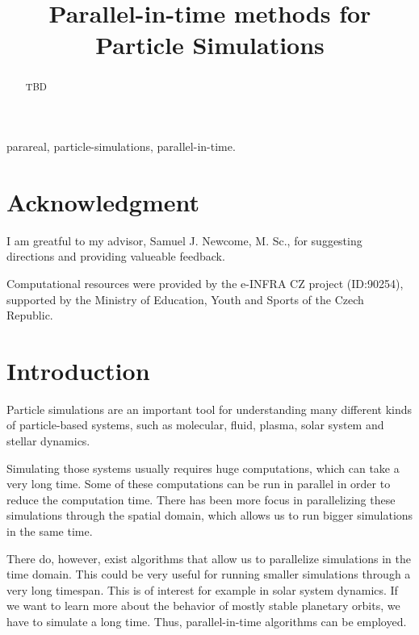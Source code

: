 \documentclass[conference]{IEEEtran}
\begin{document}
\title{Parallel-in-time methods for Particle Simulations}

\author{
}

\maketitle

\begin{abstract}
TBD
\end{abstract}

\begin{IEEEkeywords}
parareal, particle-simulations, parallel-in-time.
\end{IEEEkeywords}

\section*{Acknowledgment}

I am greatful to my advisor, Samuel J. Newcome, M. Sc., for suggesting directions and providing valueable feedback.

Computational resources were provided by the e-INFRA CZ project (ID:90254),
supported by the Ministry of Education, Youth and Sports of the Czech Republic.

\section{Introduction}

Particle simulations are an important tool for understanding many different kinds of particle-based systems, such as molecular, fluid, plasma, solar system and stellar dynamics.

Simulating those systems usually requires huge computations, which can take a very long time. Some of these computations can be run in parallel in order to reduce the computation time. There has been more focus in parallelizing these simulations through the spatial domain, which allows us to run bigger simulations in the same time.

There do, however, exist algorithms that allow us to parallelize simulations in the time domain. This could be very useful for running smaller simulations through a very long timespan. This is of interest for example in solar system dynamics. If we want to learn more about the behavior of mostly stable planetary orbits, we have to simulate a long time. Thus, parallel-in-time algorithms can be employed.\cite{parallelsolar}
\end{document}
